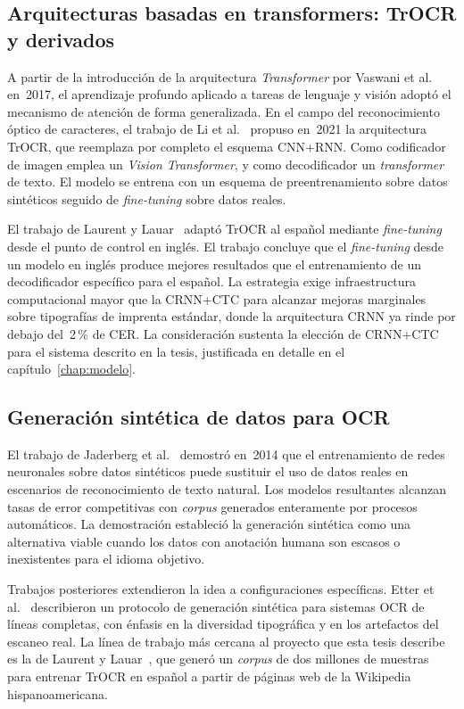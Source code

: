 \subsection{Arquitecturas basadas en transformers: TrOCR y derivados}

A partir de la introducción de la arquitectura \textit{Transformer} por Vaswani et al.~\cite{vaswani2017transformer} en~2017, el aprendizaje profundo aplicado a tareas de lenguaje y visión adoptó el mecanismo de atención de forma generalizada. En el campo del reconocimiento óptico de caracteres, el trabajo de Li et al.~\cite{li2021trocr} propuso en~2021 la arquitectura TrOCR, que reemplaza por completo el esquema CNN+RNN. Como codificador de imagen emplea un \textit{Vision Transformer}, y como decodificador un \textit{transformer} de texto. El modelo se entrena con un esquema de preentrenamiento sobre datos sintéticos seguido de \textit{fine-tuning} sobre datos reales.

El trabajo de Laurent y Lauar~\cite{laurent2024spanishtrocr} adaptó TrOCR al español mediante \textit{fine-tuning} desde el punto de control en inglés. El trabajo concluye que el \textit{fine-tuning} desde un modelo en inglés produce mejores resultados que el entrenamiento de un decodificador específico para el español. La estrategia exige infraestructura computacional mayor que la CRNN+CTC para alcanzar mejoras marginales sobre tipografías de imprenta estándar, donde la arquitectura CRNN ya rinde por debajo del~2\,\% de CER. La consideración sustenta la elección de CRNN+CTC para el sistema descrito en la tesis, justificada en detalle en el capítulo~\ref{chap:modelo}.

\subsection{Generación sintética de datos para OCR}

El trabajo de Jaderberg et al.~\cite{jaderberg2014synthetic} demostró en~2014 que el entrenamiento de redes neuronales sobre datos sintéticos puede sustituir el uso de datos reales en escenarios de reconocimiento de texto natural. Los modelos resultantes alcanzan tasas de error competitivas con \textit{corpus} generados enteramente por procesos automáticos. La demostración estableció la generación sintética como una alternativa viable cuando los datos con anotación humana son escasos o inexistentes para el idioma objetivo.

Trabajos posteriores extendieron la idea a configuraciones específicas. Etter et al.~\cite{etter2019synthrecipe} describieron un protocolo de generación sintética para sistemas OCR de líneas completas, con énfasis en la diversidad tipográfica y en los artefactos del escaneo real. La línea de trabajo más cercana al proyecto que esta tesis describe es la de Laurent y Lauar~\cite{laurent2024spanishtrocr}, que generó un \textit{corpus} de dos millones de muestras para entrenar TrOCR en español a partir de páginas web de la Wikipedia hispanoamericana.

